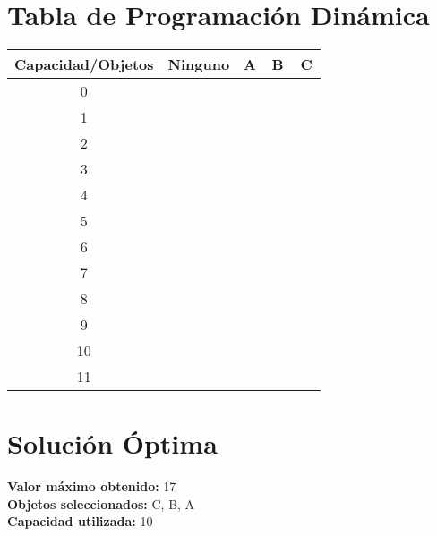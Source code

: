 \documentclass{article}
\begin{document}
\section*{Tabla de Programación Dinámica}
\begin{center}
\scriptsize
\begin{tabular}{|c|c|c|c|c|}
\hline
Capacidad/Objetos & Ninguno & A & B & C \\ \hline
0 & \cellcolor{rojo}\textcolor{white}{0} & \cellcolor{rojo}\textcolor{white}{0} & \cellcolor{rojo}\textcolor{white}{0} & \cellcolor{rojo}\textcolor{white}{0} \\ \hline
1 & \cellcolor{rojo}\textcolor{white}{0} & \cellcolor{rojo}\textcolor{white}{0} & \cellcolor{rojo}\textcolor{white}{0} & \cellcolor{rojo}\textcolor{white}{0} \\ \hline
2 & \cellcolor{rojo}\textcolor{white}{0} & \cellcolor{rojo}\textcolor{white}{0} & \cellcolor{rojo}\textcolor{white}{0} & \cellcolor{verde}\textcolor{white}{4} \\ \hline
3 & \cellcolor{rojo}\textcolor{white}{0} & \cellcolor{rojo}\textcolor{white}{0} & \cellcolor{verde}\textcolor{white}{5} & \cellcolor{rojo}\textcolor{white}{5} \\ \hline
4 & \cellcolor{rojo}\textcolor{white}{0} & \cellcolor{rojo}\textcolor{white}{0} & \cellcolor{verde}\textcolor{white}{5} & \cellcolor{rojo}\textcolor{white}{5} \\ \hline
5 & \cellcolor{rojo}\textcolor{white}{0} & \cellcolor{verde}\textcolor{white}{8} & \cellcolor{rojo}\textcolor{white}{8} & \cellcolor{verde}\textcolor{white}{9} \\ \hline
6 & \cellcolor{rojo}\textcolor{white}{0} & \cellcolor{verde}\textcolor{white}{8} & \cellcolor{rojo}\textcolor{white}{8} & \cellcolor{verde}\textcolor{white}{9} \\ \hline
7 & \cellcolor{rojo}\textcolor{white}{0} & \cellcolor{verde}\textcolor{white}{8} & \cellcolor{rojo}\textcolor{white}{8} & \cellcolor{verde}\textcolor{white}{12} \\ \hline
8 & \cellcolor{rojo}\textcolor{white}{0} & \cellcolor{verde}\textcolor{white}{8} & \cellcolor{verde}\textcolor{white}{13} & \cellcolor{rojo}\textcolor{white}{13} \\ \hline
9 & \cellcolor{rojo}\textcolor{white}{0} & \cellcolor{verde}\textcolor{white}{8} & \cellcolor{verde}\textcolor{white}{13} & \cellcolor{rojo}\textcolor{white}{13} \\ \hline
10 & \cellcolor{rojo}\textcolor{white}{0} & \cellcolor{verde}\textcolor{white}{8} & \cellcolor{verde}\textcolor{white}{13} & \cellcolor{verde}\textcolor{white}{17} \\ \hline
11 & \cellcolor{rojo}\textcolor{white}{0} & \cellcolor{verde}\textcolor{white}{8} & \cellcolor{verde}\textcolor{white}{13} & \cellcolor{verde}\textcolor{white}{17} \\ \hline
\end{tabular}
\end{center}
\normalsize

\section*{Solución Óptima}
\textbf{Valor máximo obtenido:} 17\\
\textbf{Objetos seleccionados:} C, B, A\\
\textbf{Capacidad utilizada:} 10\\
\end{document}
